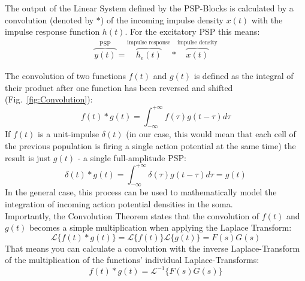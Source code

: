The output of the Linear System defined by the PSP-Blocks is calculated by a convolution (denoted by $\ast$) of the
incoming impulse density $x(t)$ with the impulse response function $h(t)$.
For the excitatory PSP this means:\\
\begin{align}
    \overbrace{y(t)}^{\text{PSP}} = \overbrace{h_e(t)}^{\text{impulse response}} \ast \overbrace{x(t)}^{\text{impulse density}} \label{eq:convolution}
\end{align}

{
    The convolution of two functions $f(t)$ and $g(t)$ is defined as the integral of their product after one function
    has been reversed and shifted (Fig.~\ref{fig:Convolution}):
    \[f(t) \ast g(t)= \int_{-\infty}^{+\infty}f(\tau)g(t-\tau) d\tau\]
    If $f(t)$ is a unit-impulse $\delta(t)$ (in our case, this would mean that each cell of the previous population
    is firing a single action potential at the same time) the result is just $g(t)$ - a
    single full-amplitude PSP:
    \[\delta(t) \ast g(t)= \int_{-\infty}^{+\infty}\delta(\tau)g(t-\tau) d\tau = g(t)\]
    In the general case, this process can be used to mathematically model the integration of
    incoming action potential densities in the soma.\\[1em]
    Importantly, the Convolution Theorem states that the convolution of $f(t)$ and $g(t)$ becomes a
    simple multiplication when applying the Laplace Transform:
    \[\mathscr{L}\{f(t) \ast g(t)\}= \mathscr{L}\{f(t)\}\mathscr{L}\{g(t)\} = F(s)G(s)\]
    That means you can calculate a convolution with the inverse Laplace-Transform of the multiplication of
    the functions' individual Laplace-Transforms:
    \[f(t) \ast g(t)= \mathscr{L}^{-1}\{F(s)G(s)\}\]
}
